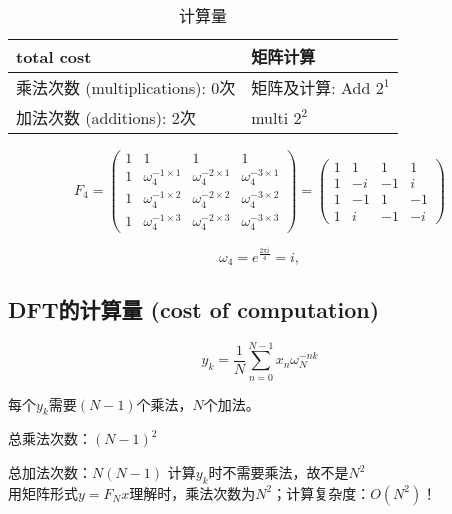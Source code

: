 \documentclass[linespread=1.5,openany]{book}%
\theoremstyle{plain}
\begin{document}
{{{					\begin{table}[h]
						\centering
						\caption{计算量}
						\begin{tabular}{|l|l|}
							\hline
							\textbf{total cost} & \textbf{矩阵计算} \\ \hline
							乘法次数 (multiplications): 0次 & 矩阵及计算: Add $2^1$ \\
							加法次数 (additions): 2次 & multi $2^2$ \\ \hline
						\end{tabular}
					\end{table}
					
					\begin{equation}
						F_4 = \begin{pmatrix}
							1 & 1 & 1 & 1 \\
							1 & \omega_4^{-1 \times 1} & \omega_4^{-2 \times 1} & \omega_4^{-3 \times 1} \\
							1 & \omega_4^{-1 \times 2} & \omega_4^{-2 \times 2} & \omega_4^{-3 \times 2} \\
							1 & \omega_4^{-1 \times 3} & \omega_4^{-2 \times 3} & \omega_4^{-3 \times 3}
						\end{pmatrix}
						=
						\begin{pmatrix}
							1 & 1 & 1 & 1 \\
							1 & -i & -1 & i \\
							1 & -1 & 1 & -1 \\
							1 & i & -1 & -i
						\end{pmatrix}
					\end{equation}
					
					\begin{equation}
						\omega_4 = e^{\frac{2\pi i}{4}} = i,
					\end{equation}
					
					\subsection{ DFT的计算量 (cost of computation)}
					
					\begin{equation}
						y_k = \frac{1}{N} \sum_{n=0}^{N-1} x_n \omega_N^{-nk}
					\end{equation}
					
					每个$y_k$需要$(N-1)$个乘法，$N$个加法。
					
					总乘法次数：$(N-1)^2$
					
					总加法次数：$N(N-1)$
					计算$y_k$时不需要乘法，故不是$N^2$\\用矩阵形式$y = F_N x$理解时，乘法次数为$N^2$；计算复杂度：$O(N^2)$！
				}
}}
\end{document}
